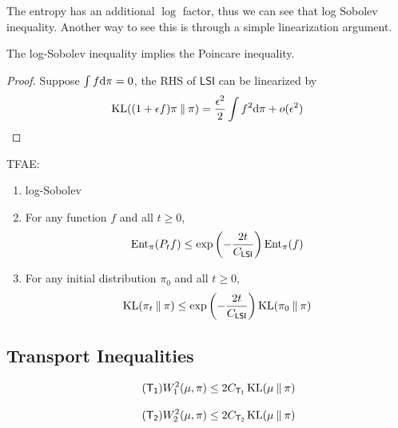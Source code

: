 The entropy has an additional $\log$ factor, thus we can see that log Sobolev inequality.
Another way to see this is through a simple linearization argument.
\begin{lemma}
    The log-Sobolev inequality implies the Poincare inequality.
\end{lemma}
\begin{proof}
    Suppose $\int f\mathrm{d} \pi=0$, the RHS of $\mathsf{LSI}$ can be linearized by
    $$\operatorname{KL}((1+\epsilon f)\pi\mathbin{\|} \pi)=\frac{\epsilon^2}{2}\int f^2\mathrm{d}\pi +o(\epsilon^2)$$
\end{proof}

\begin{theorem}
    TFAE:
    \begin{enumerate}
        \item log-Sobolev
        \item For any function $f$ and all $t\geq 0$,
        \begin{equation*}
            \operatorname{Ent}_\pi (P_tf)\leq \exp\left(-\frac{2t}{C_\mathsf{LSI}}\right)\operatorname{Ent}_\pi(f)
        \end{equation*}
        \item For any initial distribution $\pi_0$ and all $t\geq 0$,
        \begin{equation*}
            \operatorname{KL}(\pi_t\mathbin{\|} \pi)\leq \exp\left(-\frac{2t}{C_\mathsf{LSI}}\right) \operatorname{KL}(\pi_0\mathbin{\|} \pi)
        \end{equation*}
    \end{enumerate}
\end{theorem}

\subsection{Transport Inequalities}

\begin{definition}[$T_1$-inequality]
    \begin{equation}\label{eq:T1}\tag{$\mathsf{T_1}$}
        W_1^2(\mu,\pi)\leq 2C_\mathsf{T_1} \KL(\mu\mmid \pi)
    \end{equation}
\end{definition}

\begin{definition}[$T_2$-inequality]
    \begin{equation}\label{eq:T2}\tag{$\mathsf{T_2}$}
        W_2^2(\mu,\pi)\leq 2C_\mathsf{T_2} \KL(\mu\mmid \pi)
    \end{equation}
\end{definition}



